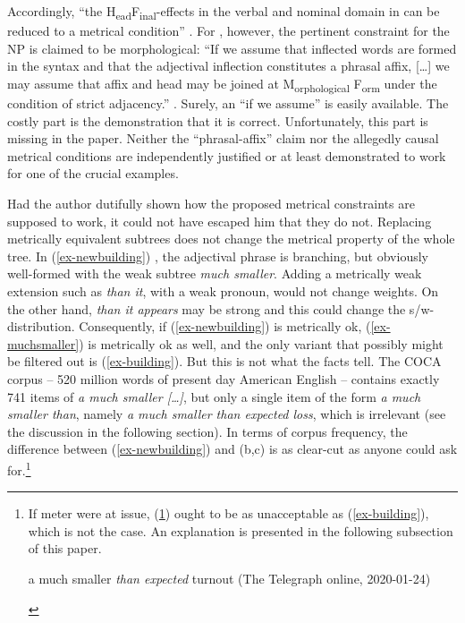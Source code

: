 \documentclass[output=paper
  ,nobabel
  ,uniformtopskip %
]{langscibook}
\begin{document}
Accordingly, ``the H\textsubscript{ead}F\textsubscript{inal}-effects in the verbal and nominal domain in  can be reduced to a metrical condition'' \citep[180]{Hinterhoelzl2016}. For , however, the pertinent constraint for the NP is claimed to be morphological: ``If we assume that inflected words are formed in the syntax and that the adjectival inflection constitutes a phrasal affix, [\ldots] we may assume that affix and head may be joined at M\textsubscript{orphological} F\textsubscript{orm} under the condition of strict adjacency.'' \citep[188]{Hinterhoelzl2016}. Surely, an ``if we assume'' is easily available. The costly part is the demonstration that it is correct.
Unfortunately, this part is missing in the paper. Neither the ``phrasal-affix'' claim nor the allegedly causal metrical conditions are independently justified or at least demonstrated to work for one of the crucial examples.

\largerpage
Had the author dutifully shown how the proposed metrical constraints are supposed to work, it could not have escaped him that they do not. Replacing metrically equivalent subtrees does not change the metrical property of the whole tree. In (\ref{ex-newbuilding}) , the adjectival phrase is branching, but obviously well-formed with the weak subtree \emph{much smaller}. Adding a metrically weak extension such as \emph{than it}, with a weak pronoun, would not change weights. On the other hand, \emph{than it appears} may be strong and this could change the s/w-distribution. Consequently, if (\ref{ex-newbuilding}) is metrically ok, (\ref{ex-muchsmaller}) is metrically ok as well, and the only variant that possibly might be filtered out is (\ref{ex-building}). But this is not what the facts tell. The COCA corpus – 520 million words of present day American English – contains exactly 741 items of \emph{a much smaller [\ldots]}, but only a single item of the form \emph{a much smaller than}, namely \emph{a much smaller than expected loss}, which is irrelevant (see the discussion in the following section). In terms of corpus frequency, the difference between (\ref{ex-newbuilding})  and (b,c)  is as clear-cut as anyone could ask for.\footnote{%
If meter were at issue, (\ref{ex-turnout}) ought to be as unacceptable as (\ref{ex-building}), which is not the case. An explanation is presented in the following subsection of this paper.

\begin{exe}
\ex\label{ex-turnout}
a much smaller \emph{than expected} turnout \hfill (The Telegraph online, 2020-01-24)
\end{exe}
}
\eal
{}\label{ex-newbuilding}
\end{document}
